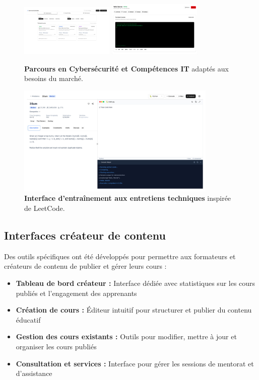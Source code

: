 \begin{figure}[H]
  \centering
  \includegraphics[width=0.4\textwidth,keepaspectratio]{old-reports/week_4_img/syber.jpeg}
  \includegraphics[width=0.4\textwidth,keepaspectratio]{old-reports/week_4_img/it.jpeg}
  \caption{\textbf{Parcours en Cybersécurité et Compétences IT} adaptés aux besoins du marché.}
  \label{fig:specialized_paths}
\end{figure}

\begin{figure}[H]
  \centering
  \includegraphics[width=0.85\textwidth,keepaspectratio]{old-reports/week_4_img/leetcode.jpeg}
  \caption{\textbf{Interface d'entraînement aux entretiens techniques} inspirée de LeetCode.}
  \label{fig:interview_prep}
\end{figure}

\subsection{Interfaces créateur de contenu}

Des outils spécifiques ont été développés pour permettre aux formateurs et créateurs de contenu de publier et gérer leurs cours :

\begin{itemize}
  \item \textbf{Tableau de bord créateur :} Interface dédiée avec statistiques sur les cours publiés et l'engagement des apprenants
  \item \textbf{Création de cours :} Éditeur intuitif pour structurer et publier du contenu éducatif
  \item \textbf{Gestion des cours existants :} Outils pour modifier, mettre à jour et organiser les cours publiés
  \item \textbf{Consultation et services :} Interface pour gérer les sessions de mentorat et d'assistance
\end{itemize}

